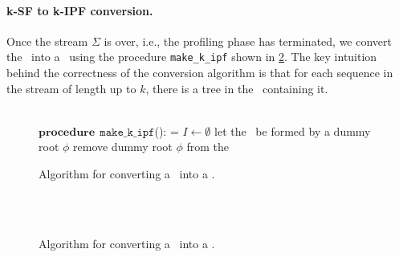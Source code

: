 \paragraph*{k-SF to k-IPF conversion.} Once the stream $\Sigma$ is over, i.e., the profiling phase has terminated, we convert the \ksf\ into a \kipf\ using the procedure {\tt make\_k\_ipf} shown in \myalgorithm\ref{alg:kblpp-ksf-to-kipf}.
The key intuition behind the correctness of the conversion algorithm is that for each sequence in the stream of length up to $k$, there is a tree in the \ksf\ containing it.

\ifdefined\noauthorea
\begin{figure}[hb!]
\IncMargin{2em}
\begin{algorithm}[H]
\DontPrintSemicolon
\LinesNumbered
\SetAlgoNoLine
\SetNlSkip{1em} 
\Indm\Indmm
\hrulefill\\
$\mathbf{procedure} \> \> \texttt{make\_k\_ipf}$():\;
\vspace{1mm}
\everypar={\nl}
\Indp\Indpp
$I\gets\emptyset$\;
let the \kipf\ be formed by a dummy root $\phi$\;
remove dummy root $\phi$ from the \kipf\;
\vspace{-2mm}
\Indm\Indmm
\nonl\hrulefill\vspace{1mm}\\
\DecMargin{3.5em}
\caption{\label{alg:kblpp-ksf-to-kipf} Algorithm for converting a \ksf\ into a \kipf.}
\IncMargin{1.5em}
\end{algorithm}
\end{figure}

\else
\begin{figure}[ht]
\caption{\label{alg:kblpp-ksf-to-kipf} Algorithm for converting a \ksf\ into a \kipf.}
\begin{small}
\begin{minipage}{0.9\textwidth}
\hrulefill\\
\algmissing\

\vspace{-1mm}
\hrulefill
\vspace{-2mm}
\end{minipage}
\end{small}
\end{figure}
\fi

